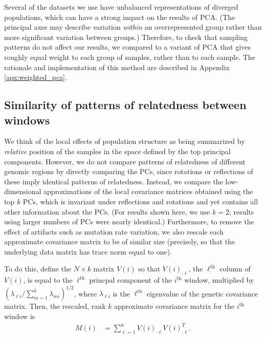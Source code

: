 \documentclass[11pt, oneside]{article}   	%
\begin{document}
Several of the datasets we use have unbalanced representations of diverged populations,
which can have a strong impact on the results of PCA.
(The principal axes may describe variation \emph{within} an overrepresented group
rather than more significant variation between groups.)
Therefore, to check that sampling patterns do not affect our results,
we compared to a variant of PCA that gives roughly equal weight to each group of samples,
rather than to each sample.
The rationale and implementation of this method are described in Appendix \ref{apx:weighted_pca}.


\subsection{Similarity of patterns of relatedness between windows}

We think of the local effects of population structure as being summarized by \emph{relative} position of the samples
in the space defined by the top principal components.
However, 
we do not compare patterns of relatedness of different genomic regions by directly comparing the PCs,
since rotations or reflections of these imply identical patterns of relatedness.
Instead, we compare the low-dimensional approximations of the local covariance matrices
obtained using the top $k$ PCs,
which is invariant under reflections and rotations and yet contains all other information about the PCs.
(For results shown here, we use $k=2$;
results using larger numbers of PCs were nearly identical.)
Furthermore, to remove the effect of artifacts such as mutation rate variation,
we also rescale each approximate covariance matrix to be of similar size
(precisely, so that the underlying data matrix has trace norm equal to one).

To do this, define the $N \times k$ matrix $V(i)$ so that $V(i)_{\cdot \ell}$, 
the $\ell^\text{th}$ column of $V(i)$,
is equal to the $\ell^\text{th}$ princpal component of the $i^\text{th}$ window,
multiplied by $( \lambda_{\ell i} / \sum_{m=1}^k \lambda_{m i} )^{1/2}$,
where $\lambda_{\ell i}$ is the $\ell^\text{th}$ eigenvalue of the genetic covariance matrix.
Then, the rescaled, rank $k$ approximate covariance matrix for the $i^\text{th}$ window is
\begin{align} \label{eqn:est_cov}
    M(i) &= \sum_{\ell=1}^k V(i)_{\cdot \ell} V(i)_{\cdot \ell}^T .
\end{align}
\end{document}
